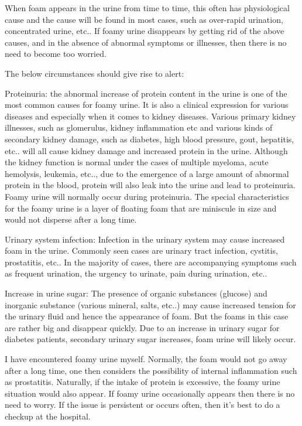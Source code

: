 \documentclass[
]{book}
\begin{document}
When foam appears in the urine from time to time, this often has physiological cause and the cause will be found in most cases, such as over-rapid urination, concentrated urine, etc.. If foamy urine disappears by getting rid of the above causes, and in the absence of abnormal symptoms or illnesses, then there is no need to become too worried.

The below circumstances should give rise to alert:

Proteinuria: the abnormal increase of protein content in the urine is one of the most common causes for foamy urine. It is also a clinical expression for various diseases and especially when it comes to kidney diseases. Various primary kidney illnesses, such as glomerulus, kidney inflammation etc and various kinds of secondary kidney damage, such as diabetes, high blood pressure, gout, hepatitis, etc.. will all cause kidney damage and increased protein in the urine. Although the kidney function is normal under the cases of multiple myeloma, acute hemolysis, leukemia, etc.., due to the emergence of a large amount of abnormal protein in the blood, protein will also leak into the urine and lead to proteinuria. Foamy urine will normally occur during proteinuria. The special characteristics for the foamy urine is a layer of floating foam that are miniscule in size and would not disperse after a long time.

Urinary system infection: Infection in the urinary system may cause increased foam in the urine. Commonly seen cases are urinary tract infection, cystitis, prostatitis, etc.. In the majority of cases, there are accompanying symptoms such as frequent urination, the urgency to urinate, pain during urination, etc..

Increase in urine sugar: The presence of organic substances (glucose) and inorganic substance (various mineral, salts, etc..) may cause increased tension for the urinary fluid and hence the appearance of foam. But the foams in this case are rather big and disappear quickly. Due to an increase in urinary sugar for diabetes patients, secondary urinary sugar increases, foam urine will likely occur.

I have encountered foamy urine myself. Normally, the foam would not go away after a long time, one then considers the possibility of internal inflammation such as prostatitis. Naturally, if the intake of protein is excessive, the foamy urine situation would also appear. If foamy urine occasionally appears then there is no need to worry. If the issue is persistent or occurs often, then it's best to do a checkup at the hospital.
\end{document}
